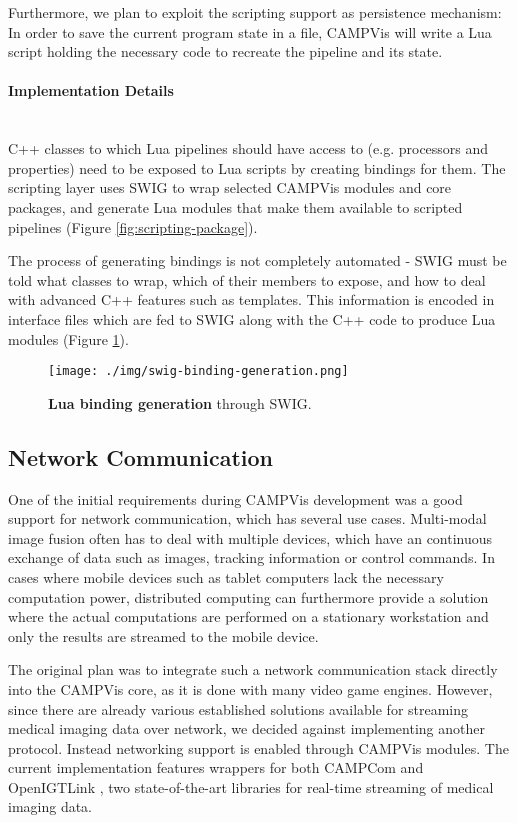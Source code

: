 Furthermore, we plan to exploit the scripting support as persistence mechanism:
In order to save the current program state in a file, CAMPVis will write a Lua script holding the necessary code to recreate the pipeline and its state.


\paragraph{Implementation Details}~\\
C++ classes to which Lua pipelines should have access to (e.g. processors and properties) need to be exposed to Lua scripts by creating bindings for them. The scripting layer uses SWIG \cite{swig} to wrap selected CAMPVis modules and core packages, and generate Lua modules that make them available to scripted pipelines (Figure \ref{fig:scripting-package}).

The process of generating bindings is not completely automated - SWIG must be told what classes to wrap, which of their members to expose, and how to deal with advanced C++ features such as templates. This information is encoded in interface files which are fed to SWIG along with the C++ code to produce Lua modules (Figure \ref{fig:swig-binding-generation}).

\begin{figure}[htb]
	\centering
	\texttt{[image: ./img/swig-binding-generation.png]}
	\caption{\textbf{Lua binding generation} through SWIG.}
	\label{fig:swig-binding-generation}
\end{figure}

\subsection{Network Communication}
\label{sec:network-communication}
One of the initial requirements during CAMPVis development was a good support for network communication, which has several use cases.
Multi-modal image fusion often has to deal with multiple devices, which have an continuous exchange of data such as images, tracking information or control commands.
In cases where mobile devices such as tablet computers lack the necessary computation power, distributed computing can furthermore provide a solution where the actual computations are performed on a stationary workstation and only the results are streamed to the mobile device.

The original plan was to integrate such a network communication stack directly into the CAMPVis core, as it is done with many video game engines.
However, since there are already various established solutions available for streaming medical imaging data over network, we decided against implementing another protocol.
Instead networking support is enabled through CAMPVis modules.
The current implementation features wrappers for both CAMPCom \cite{schoch2013lightweight} and OpenIGTLink \cite{tokuda2009openigtlink}, two state-of-the-art libraries for real-time streaming of medical imaging data.



